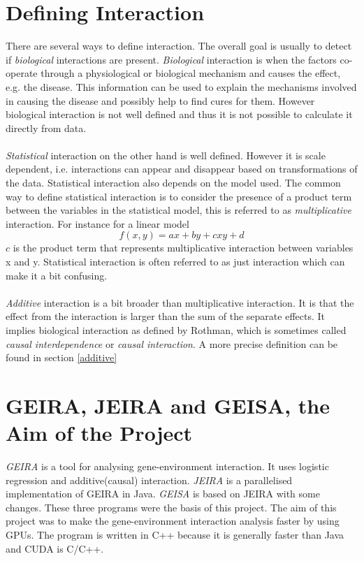 \documentclass[10pt,a4paper]{report}
\begin{document}
\section{Defining Interaction}
There are several ways to define interaction. The overall goal is usually to detect if \emph{biological} interactions are present. \emph{Biological} interaction is when the factors co-operate through a physiological or biological mechanism and causes the effect, e.g. the disease. This information can be used to explain the mechanisms involved in causing the disease and possibly help to find cures for them. However biological interaction is not well defined and thus it is not possible to calculate it directly from data.\cite{rothman1998modern,rothman2002intro_epidemiology}\\
\\
\emph{Statistical} interaction on the other hand is well defined. However it is scale dependent, i.e. interactions can appear and disappear based on transformations of the data. Statistical interaction also depends on the model used. The common way to define statistical interaction is to consider the presence of a product term between the variables in the statistical model, this is referred to as \emph{multiplicative} interaction. For instance for a linear model
\begin{equation}
f(x,y)=ax+by+cxy+d
\end{equation}
$c$ is the product term that represents multiplicative interaction between variables x and y. Statistical interaction is often referred to as just interaction which can make it a bit confusing.\cite{geira,rothman1998modern}\\
\\
\emph{Additive} interaction is a bit broader than multiplicative interaction. It is that the effect from the interaction is larger than the sum of the separate effects. It implies biological interaction as defined by Rothman, which is sometimes called \emph{causal interdependence} or \emph{causal interaction}. A more precise definition can be found in section \ref{additive}

\section{GEIRA, JEIRA and GEISA, the Aim of the Project}
\label{jeira}
\emph{GEIRA} is a tool for analysing gene-environment interaction. It uses logistic regression and additive(causal) interaction\cite{geira}. \emph{JEIRA} is a parallelised implementation of GEIRA in Java\cite{uvehag_master_thesis}. \emph{GEISA} is based on JEIRA with some changes\cite{geisa}. These three programs were the basis of this project. The aim of this project was to make the gene-environment interaction analysis faster by using GPUs. The program is written in C++ because it is generally faster than Java and CUDA is C/C++.
\end{document}
